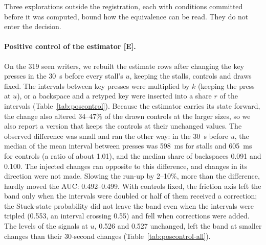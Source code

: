 Three explorations outside the registration, each with conditions committed before it was computed, bound how the
equivalence can be read. They do not enter the decision.

\paragraph{Positive control of the estimator [E].} On the 319 seen writers, we rebuilt the estimate rows after changing
the key presses in the 30~s before every stall's $u$, keeping the stalls, controls and draws fixed. The intervals
between key presses were multiplied by $k$ (keeping the press at $u$), or a backspace and a retyped key were inserted
into a share $r$ of the intervals (Table~\ref{tab:poscontrol}). Because the estimator carries its state forward, the change also altered 34--47\% of the drawn
controls at the larger sizes, so we also report a version that keeps the controls at their unchanged values. The
observed difference was small and ran the other way: in the 30~s before $u$, the median of the mean interval between
presses was 598~ms for stalls and 605~ms for controls (a ratio of about 1.01), and the median share of backspaces 0.091
and 0.100. The injected changes ran opposite to this difference, and changes in its direction were not made. Slowing the run-up
by 2--10\%, more than the difference, hardly moved the AUC: 0.492--0.499. With controls
fixed, the friction axis left the band only when the intervals were doubled or half of them received a correction; the
Stuck-state probability did not leave the band even when the intervals were tripled (0.553, an interval crossing 0.55)
and fell when corrections were added. The levels of the signals at $u$, 0.526 and 0.527 unchanged, left the band at
smaller changes than their 30-second changes (Table~\ref{tab:poscontrol-all}).

